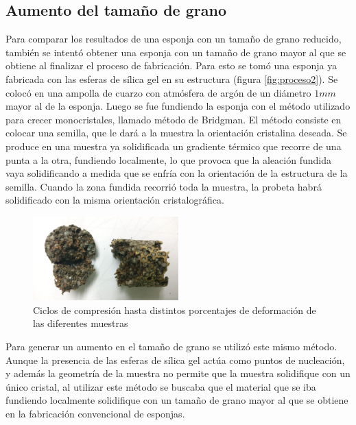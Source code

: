 \documentclass[a4paper,12pt,fleqn,twoside,openany]{book}
\begin{document}
   




\subsection{Aumento del tamaño de grano} \label{aumento}


Para comparar los resultados de una esponja con un tamaño de grano reducido, también se intentó obtener una esponja con un tamaño de grano mayor al que se obtiene al finalizar el proceso de fabricación. Para esto se tomó una esponja ya fabricada con las esferas de sílica gel en su estructura (figura \ref{fig:proceso2}). Se colocó en una ampolla de cuarzo con atmósfera de argón de un diámetro  $1 mm$ mayor al de la esponja. Luego se fue fundiendo la esponja con el método utilizado para crecer monocristales, llamado método de Bridgman. El método consiste en colocar una semilla, que le dará a la muestra la orientación cristalina deseada. Se produce en una muestra ya solidificada un gradiente térmico que recorre de una punta a la otra, fundiendo localmente, lo que provoca que la aleación fundida vaya solidificando a medida que se enfría con la orientación de la estructura de la semilla. Cuando la zona fundida recorrió toda la muestra, la probeta habrá solidificado con la misma orientación cristalográfica.

 \begin{figure}[h]
 \centering
 \includegraphics[width=0.5\textwidth]{Img/Resultados/EspRota.jpg}
 \caption{Ciclos de compresión hasta distintos porcentajes de deformación de las diferentes muestras  } 
 \label{fig: EspRota}
 \end{figure}

Para generar un aumento en el tamaño de grano se utilizó este mismo método. Aunque la presencia de las esferas de sílica gel actúa como puntos de nucleación, y además la geometría de la muestra no permite que la muestra solidifique con un único cristal, al utilizar este método se buscaba que el material que se iba fundiendo localmente solidifique con un tamaño de grano mayor al que se obtiene en la fabricación convencional de esponjas.
\end{document}
